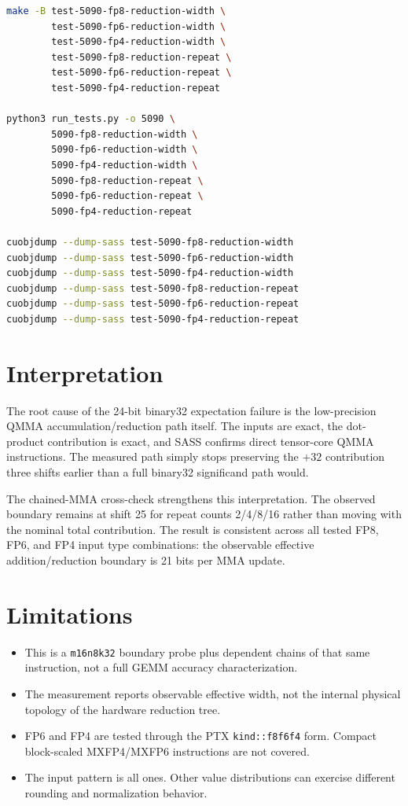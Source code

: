 \documentclass[11pt]{article}
\begin{document}
\begin{lstlisting}[language=bash]
make -B test-5090-fp8-reduction-width \
        test-5090-fp6-reduction-width \
        test-5090-fp4-reduction-width \
        test-5090-fp8-reduction-repeat \
        test-5090-fp6-reduction-repeat \
        test-5090-fp4-reduction-repeat

python3 run_tests.py -o 5090 \
        5090-fp8-reduction-width \
        5090-fp6-reduction-width \
        5090-fp4-reduction-width \
        5090-fp8-reduction-repeat \
        5090-fp6-reduction-repeat \
        5090-fp4-reduction-repeat

cuobjdump --dump-sass test-5090-fp8-reduction-width
cuobjdump --dump-sass test-5090-fp6-reduction-width
cuobjdump --dump-sass test-5090-fp4-reduction-width
cuobjdump --dump-sass test-5090-fp8-reduction-repeat
cuobjdump --dump-sass test-5090-fp6-reduction-repeat
cuobjdump --dump-sass test-5090-fp4-reduction-repeat
\end{lstlisting}

\section{Interpretation}

The root cause of the 24-bit binary32 expectation failure is the low-precision
QMMA accumulation/reduction path itself. The inputs are exact, the dot-product
contribution is exact, and SASS confirms direct tensor-core QMMA instructions.
The measured path simply stops preserving the \(+32\) contribution three shifts
earlier than a full binary32 significand path would.

The chained-MMA cross-check strengthens this interpretation. The observed
boundary remains at shift 25 for repeat counts 2/4/8/16 rather than moving with
the nominal total contribution. The result is consistent across all tested FP8,
FP6, and FP4 input type combinations: the observable effective
addition/reduction boundary is 21 bits per MMA update.

\section{Limitations}

\begin{itemize}
\item This is a \texttt{m16n8k32} boundary probe plus dependent chains of that
same instruction, not a full GEMM accuracy characterization.
\item The measurement reports observable effective width, not the internal
physical topology of the hardware reduction tree.
\item FP6 and FP4 are tested through the PTX \texttt{kind::f8f6f4} form.
Compact block-scaled MXFP4/MXFP6 instructions are not covered.
\item The input pattern is all ones. Other value distributions can exercise
different rounding and normalization behavior.
\end{itemize}
\end{document}
